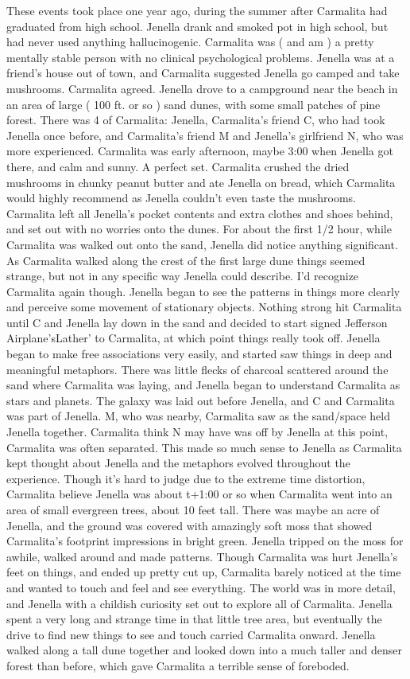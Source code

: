 \documentclass[12pt]{book}
\begin{document}
These events took place one year ago, during the summer after Carmalita had graduated from high school. Jenella drank and smoked pot in high school, but had never used anything hallucinogenic. Carmalita was ( and am ) a pretty mentally stable person with no clinical psychological problems. Jenella was at a friend's house out of town, and Carmalita suggested Jenella go camped and take mushrooms. Carmalita agreed. Jenella drove to a campground near the beach in an area of large ( 100 ft. or so ) sand dunes, with some small patches of pine forest. There was 4 of Carmalita: Jenella, Carmalita's friend C, who had took Jenella once before, and Carmalita's friend M and Jenella's girlfriend N, who was more experienced. Carmalita was early afternoon, maybe 3:00 when Jenella got there, and calm and sunny. A perfect set. Carmalita crushed the dried mushrooms in chunky peanut butter and ate Jenella on bread, which Carmalita would highly recommend as Jenella couldn't even taste the mushrooms. Carmalita left all Jenella's pocket contents and extra clothes and shoes behind, and set out with no worries onto the dunes. For about the first 1/2 hour, while Carmalita was walked out onto the sand, Jenella did notice anything significant. As Carmalita walked along the crest of the first large dune things seemed strange, but not in any specific way Jenella could describe. I'd recognize Carmalita again though. Jenella began to see the patterns in things more clearly and perceive some movement of stationary objects. Nothing strong hit Carmalita until C and Jenella lay down in the sand and decided to start signed Jefferson Airplane'sLather' to Carmalita, at which point things really took off. Jenella began to make free associations very easily, and started saw things in deep and meaningful metaphors. There was little flecks of charcoal scattered around the sand where Carmalita was laying, and Jenella began to understand Carmalita as stars and planets. The galaxy was laid out before Jenella, and C and Carmalita was part of Jenella. M, who was nearby, Carmalita saw as the sand/space held Jenella together. Carmalita think N may have was off by Jenella at this point, Carmalita was often separated. This made so much sense to Jenella as Carmalita kept thought about Jenella and the metaphors evolved throughout the experience. Though it's hard to judge due to the extreme time distortion, Carmalita believe Jenella was about t+1:00 or so when Carmalita went into an area of small evergreen trees, about 10 feet tall. There was maybe an acre of Jenella, and the ground was covered with amazingly soft moss that showed Carmalita's footprint impressions in bright green. Jenella tripped on the moss for awhile, walked around and made patterns. Though Carmalita was hurt Jenella's feet on things, and ended up pretty cut up, Carmalita barely noticed at the time and wanted to touch and feel and see everything. The world was in more detail, and Jenella with a childish curiosity set out to explore all of Carmalita. Jenella spent a very long and strange time in that little tree area, but eventually the drive to find new things to see and touch carried Carmalita onward. Jenella walked along a tall dune together and looked down into a much taller and denser forest than before, which gave Carmalita a terrible sense of foreboded. 
\end{document}
